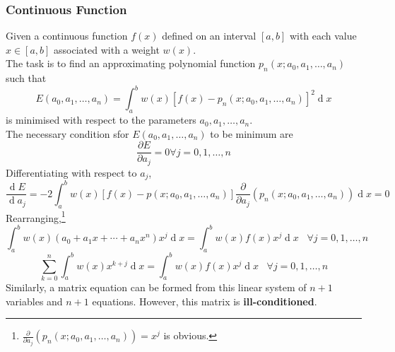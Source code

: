 \documentclass[12pt]{article}
\theoremstyle{definition}
\DeclareMathOperator{\diff}{d}
\begin{document}
\subsubsection{Continuous Function}
Given a continuous function $f(x)$ defined on an interval $[a,b]$ with each value $x\in[a,b]$ associated with a weight $w(x)$. \\
The task is to find an approximating polynomial function $p_n(x;a_0,a_1,\ldots, a_n)$ such that
\[
E(a_0,a_1,\ldots, a_n)=\int_a^b w(x)[f(x)-p_n(x;a_0,a_1,\ldots, a_n)]^2\diff x
\]
is minimised with respect to the parameters $a_0,a_1,\ldots, a_n$.\\
The necessary condition sfor $E(a_0,a_1,\ldots, a_n)$ to be minimum are
\[
\frac{\partial E}{\partial a_j}=0 \forall j = 0,1,\ldots, n
\]
Differentiating with respect to $a_j$,
\[
\frac{\diff E}{\diff a_j} = -2\int_a^b w(x)[f(x)-p(x;a_0,a_1,\ldots, a_n)]\frac{\partial}{\partial a_j}(p_n(x;a_0,a_1,\ldots, a_n))\diff x = 0
\]
Rearranging,\footnote{$\frac{\partial}{\partial a_j}(p_n(x;a_0,a_1,\ldots, a_n))=x^j$ is obvious.}
\[
\int_a^b w(x)(a_0+a_1x+\cdots+a_nx^n)x^j\diff x = \int_a^b w(x)f(x)x^j\diff x\;\;\;\forall j = 0,1,\ldots, n
\]
\[
\sum_{k = 0}^n \int_a^b w(x)x^{k+j}\diff x = \int_a^b w(x)f(x)x^j\diff x\;\;\;\forall j = 0,1,\ldots, n
\]
Similarly, a matrix equation can be formed from this linear system of $n+1$ variables and $n+1$ equations. However, this matrix is \textbf{ill-conditioned}. 
\end{document}
